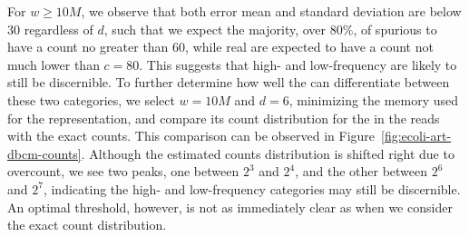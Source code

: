 For $w \geq 10M$, we observe that both error mean and standard deviation are below $30$ regardless of $d$, such that we expect the majority, over $80\%$, of spurious  to have a count no greater than $60$, while real  are expected to have a count not much lower than $c=80$. This suggests that high- and low-frequency  are likely to still be discernible. To further determine how well the \dBCM can differentiate between these two categories, we select $w=10M$ and $d=6$, minimizing the memory used for the representation, and compare its count distribution for the  in the reads with the exact counts. This comparison can be observed in Figure~\ref{fig:ecoli-art-dbcm-counts}. Although the estimated counts distribution is shifted right due to overcount, we see two peaks, one between $2^3$ and $2^4$, and the other between $2^6$ and $2^7$, indicating the high- and low-frequency categories may still be discernible. An optimal threshold, however, is not as immediately clear as when we consider the exact count distribution.


